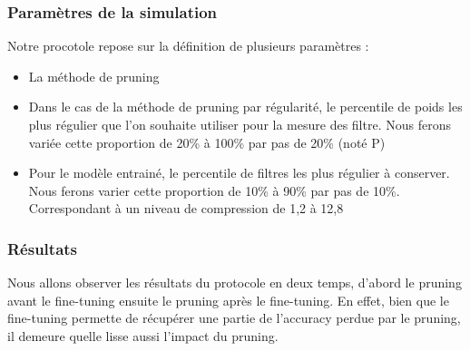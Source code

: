 \documentclass[12pt,a4paper]{article}
\begin{document}
\subsubsection{Paramètres de la simulation}
Notre procotole repose sur la définition de plusieurs paramètres :
\begin{itemize}
    \item La méthode de pruning 
    \item Dans le cas de la méthode de pruning par régularité, le percentile de poids les plus régulier que l'on souhaite utiliser pour la mesure des filtre. 
          Nous ferons variée cette proportion de 20\% à 100\% par pas de 20\% (noté P)
    \item Pour le modèle entrainé, le percentile de filtres les plus régulier à conserver. Nous ferons varier cette proportion de 10\% à 90\% par pas de 10\%. Correspondant à un niveau de compression de 1,2 à 12,8
\end{itemize}
\subsubsection{Résultats}
Nous allons observer les résultats du protocole en deux temps, d'abord le pruning avant le fine-tuning ensuite le pruning après le fine-tuning. En effet, bien que le fine-tuning permette de récupérer une partie de l'accuracy perdue par le pruning, il demeure quelle lisse aussi l'impact du pruning. 
\end{document}
